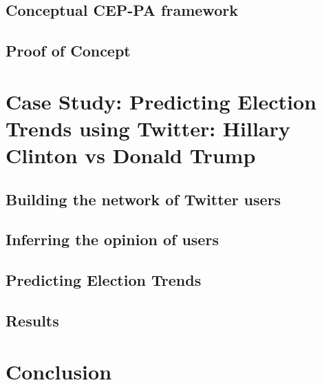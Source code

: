 \documentclass[runningheads]{llncs}
\begin{document}
\subsection{Conceptual CEP-PA framework}
\subsection{Proof of Concept}
\section{Case Study: Predicting Election Trends using Twitter: Hillary Clinton vs Donald Trump}
\subsection{Building the network of Twitter users}
\subsection{Inferring the opinion of users}
\subsection{Predicting Election Trends}
\subsection{Results}
\section{Conclusion}


\end{document}
